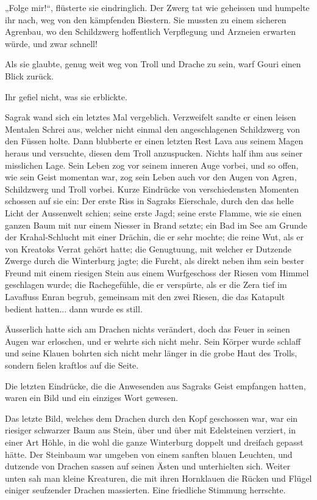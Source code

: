 „Folge mir!“, flüsterte sie eindringlich. Der Zwerg tat wie geheissen und humpelte ihr nach, weg von den kämpfenden Biestern. Sie mussten zu einem sicheren Agrenbau, wo den Schildzwerg hoffentlich Verpflegung und Arzneien erwarten würde, und zwar schnell!

Als sie glaubte, genug weit weg von Troll und Drache zu sein, warf Gouri einen Blick zurück.

Ihr gefiel nicht, was sie erblickte.

Sagrak wand sich ein letztes Mal vergeblich. Verzweifelt sandte er einen leisen Mentalen Schrei aus, welcher nicht einmal den angeschlagenen Schildzwerg von den Füssen holte. Dann blubberte er einen letzten Rest Lava aus seinem Magen heraus und versuchte, diesen dem Troll anzuspucken. Nichts half ihm aus seiner misslichen Lage. Sein Leben zog vor seinem inneren Auge vorbei, und so offen, wie sein Geist momentan war, zog sein Leben auch vor den Augen von Agren, Schildzwerg und Troll vorbei. Kurze Eindrücke von verschiedensten Momenten schossen auf sie ein: Der erste Riss in Sagraks Eierschale, durch den das helle Licht der Aussenwelt schien; seine erste Jagd; seine erste Flamme, wie sie einen ganzen Baum mit nur einem Niesser in Brand setzte; ein Bad im See am Grunde der Krahal-Schlucht mit einer Drächin, die er sehr mochte; die reine Wut, als er von Kreatoks Verrat gehört hatte; die Genugtuung, mit welcher er Dutzende Zwerge durch die Winterburg jagte; die Furcht, als direkt neben ihm sein bester Freund mit einem riesigen Stein aus einem Wurfgeschoss der Riesen vom Himmel geschlagen wurde; die Rachegefühle, die er verspürte, als er die Zera tief im Lavafluss Enran begrub, gemeinsam mit den zwei Riesen, die das Katapult bedient hatten... dann wurde es still.

Äusserlich hatte sich am Drachen nichts verändert, doch das Feuer in seinen Augen war erloschen, und er wehrte sich nicht mehr. Sein Körper wurde schlaff und seine Klauen bohrten sich nicht mehr länger in die grobe Haut des Trolls, sondern fielen kraftlos auf die Seite.

Die letzten Eindrücke, die die Anwesenden aus Sagraks Geist empfangen hatten, waren ein Bild und ein einziges Wort gewesen.

Das letzte Bild, welches dem Drachen durch den Kopf geschossen war, war ein riesiger schwarzer Baum aus Stein, über und über mit Edelsteinen verziert, in einer Art Höhle, in die wohl die ganze Winterburg doppelt und dreifach gepasst hätte. Der Steinbaum war umgeben von einem sanften blauen Leuchten, und dutzende von Drachen sassen auf seinen Ästen und unterhielten sich. Weiter unten sah man kleine Kreaturen, die mit ihren Hornklauen die Rücken und Flügel einiger seufzender Drachen massierten. Eine friedliche Stimmung herrschte.

